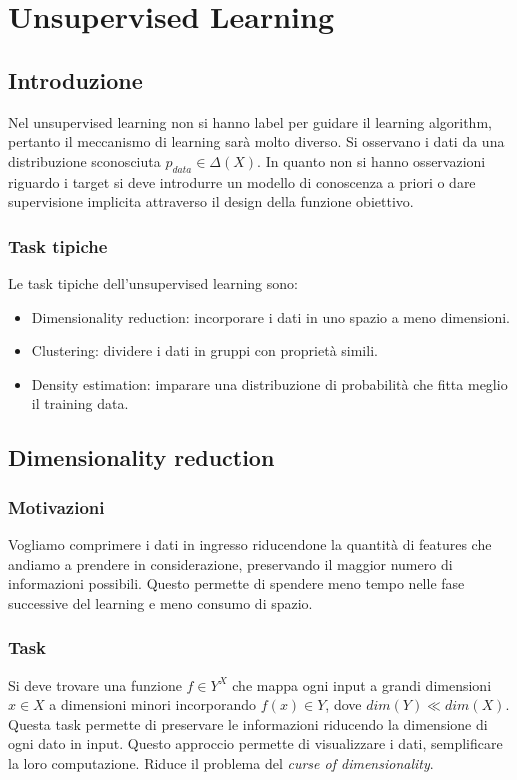 \chapter{Unsupervised Learning}

\section{Introduzione}
Nel unsupervised learning non si hanno label per guidare il learning algorithm, pertanto il meccanismo di learning sar\`a molto diverso.
Si osservano i dati da una distribuzione sconosciuta $p_{data}\in\Delta(X)$.
In quanto non si hanno osservazioni riguardo i target si deve introdurre un modello di conoscenza a priori o dare supervisione implicita attraverso il design della funzione obiettivo.

\subsection{Task tipiche}
Le task tipiche dell'unsupervised learning sono:
\begin{itemize}
	\item Dimensionality reduction: incorporare i dati in uno spazio a meno dimensioni.
	\item Clustering: dividere i dati in gruppi con propriet\`a simili.
	\item Density estimation: imparare una distribuzione di probabilit\`a che fitta meglio il training data.
\end{itemize}

\section{Dimensionality reduction}
\subsection{Motivazioni}
Vogliamo comprimere i dati in ingresso riducendone la quantit\`a di features che andiamo a prendere in considerazione, preservando il maggior numero di informazioni possibili. Questo permette di spendere meno tempo nelle fase successive del learning e meno consumo di spazio.
\subsection{Task}
Si deve trovare una funzione $f\in Y^X$ che mappa ogni input a grandi dimensioni $x\in X$ a dimensioni minori incorporando $f(x)\in Y$, dove $dim(Y)\ll dim(X)$.
Questa task permette di preservare le informazioni riducendo la dimensione di ogni dato in input.
Questo approccio permette di visualizzare i dati, semplificare la loro computazione.
Riduce il problema del \emph{curse of dimensionality}.
